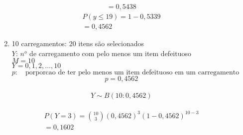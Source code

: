 \begin{description}
\begin{enumerate}[label=(\alph*)]
\begin{align*}
            =0,5438
          \end{align*}
          \begin{align*}
            P(y\le 19)=1-0,5339\\
            =0,4562
          \end{align*}
        \item 10 carregamentos: 20 itens são selecionados \\
          $Y$: $n^o$ de carregamento com pelo menos um item defeituoso \\
          $M=10$\\
          $Y=0,1,2,\ldots,10$\\
          $p:\quad \text{porporcao de ter pelo menos um item defeituoso em um carregamento}$\\
          $$p=0,4562$$\\
          $$Y \sim B(10:0,4562)$$\\
          \begin{align*}
            P(Y=3)=\binom{10}{3}(0,4562)^3 (1-0,4562)^{10-3}\\
            =0,1602
          \end{align*}
      \end{enumerate}
    \end{description}

